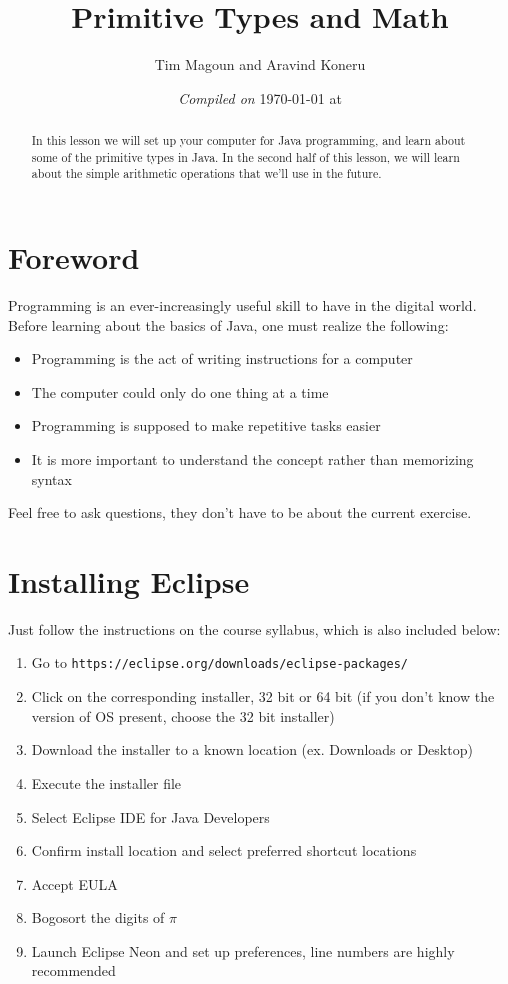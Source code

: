 \documentclass[11pt,fleqn]{article}
\begin{document}
\title{Primitive Types and Math}%
\author{Tim Magoun and Aravind Koneru}
\date{\textit{Compiled on} \today \hspace{1mm} at \currenttime}
\maketitle

\begin{abstract}
In this lesson we will set up your computer for Java programming, and learn about some of the primitive types in Java. In the second half of this lesson, we will learn about the simple arithmetic operations that we'll use in the future.
\end{abstract}

\section*{Foreword}
Programming is an ever-increasingly useful skill to have in the digital world. Before learning about the basics of Java, one must realize the following:
\begin{itemize}
\item Programming is the act of writing instructions for a computer
\item The computer could only do one thing at a time
\item Programming is supposed to make repetitive tasks easier
\item It is more important to understand the concept rather than memorizing syntax
\end{itemize}
Feel free to ask questions, they don't have to be about the current exercise.

\newpage
\section{Installing Eclipse}
Just follow the instructions on the course syllabus, which is also included below:
\begin{enumerate}
\item Go to \texttt{https://eclipse.org/downloads/eclipse-packages/}
\item Click on the corresponding installer, 32 bit or 64 bit (if you don't know the version of OS present, choose the 32 bit installer)
\item Download the installer to a known location (ex. Downloads or Desktop)
\item Execute the installer file
\item Select Eclipse IDE for Java Developers
\item Confirm install location and select preferred shortcut locations
\item Accept EULA
\item Bogosort the digits of $\pi$
\item Launch Eclipse Neon and set up preferences, line numbers are highly recommended
\end{enumerate}
\end{document}
